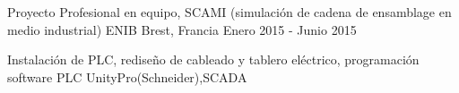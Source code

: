 \begin{cventries}
\cventry
{Proyecto Profesional en equipo, SCAMI (simulación de cadena de ensamblage en  medio
industrial)}
{ENIB} %
{Brest, Francia} %
{Enero 2015 - Junio 2015 } %
{
	\begin{cvitems} %
		\item{Instalación de PLC, rediseño de cableado y tablero eléctrico, programación software PLC
		UnityPro(Schneider),SCADA}
	\end{cvitems}
}



\end{cventries}
